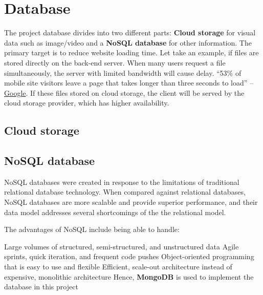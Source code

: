 \section{Database}
The project database divides into two different parts: \textbf{Cloud storage} for visual data such as image/video and a \textbf{NoSQL database} for other information. The primary target is to reduce website loading time. Let take an example, if files are stored directly on the back-end server. When many users request a file simultaneously, the server with limited bandwidth will cause delay. “53\% of mobile site visitors leave a page that takes longer than three seconds to load” – \href{https://think.storage.googleapis.com/docs/mobile-page-speed-new-industry-benchmarks.pdf}{Google}. If these files stored on cloud storage, the client will be served by the cloud storage provider, which has higher availability.
\subsection{Cloud storage}

\subsection{NoSQL database}
NoSQL databases were created in response to the limitations of traditional relational database technology. When compared against relational databases, NoSQL databases are more scalable and provide superior performance, and their data model addresses several shortcomings of the the relational model.

The advantages of NoSQL include being able to handle:

Large volumes of structured, semi-structured, and unstructured data
Agile sprints, quick iteration, and frequent code pushes
Object-oriented programming that is easy to use and flexible
Efficient, scale-out architecture instead of expensive, monolithic architecture
Hence, \textbf{MongoDB} is used to implement the database in this project
